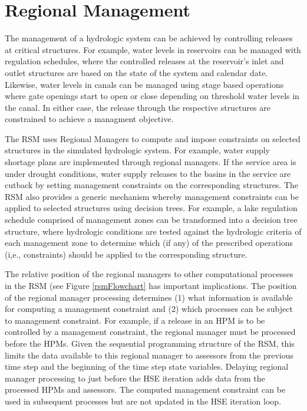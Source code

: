 \chapter{Regional Management}\label{chapter:RegionalManager}

The management of a hydrologic system can be achieved by controlling
releases at critical structures. For example, water levels in
reservoirs can be managed with regulation schedules, where the
controlled releases at the reservoir's inlet and outlet structures are
based on the state of the system and calendar date. Likewise, water
levels in canals can be managed using stage based operations where
gate openings start to open or close depending on threshold water
levels in the canal. In either case, the release through the
respective structures are constrained to achieve a managment
objective.

The RSM uses Regional Managers to compute and impose constraints on
selected structures in the simulated hydrologic system. For example,
water supply shortage plans are implemented through regional
managers. If the service area is under drought conditions, water
supply releases to the basins in the service are cutback by setting
management constraints on the corresponding structures. The RSM also
provides a generic mechanism whereby management constraints can be
applied to selected structures using decision trees. For example, a
lake regulation schedule comprised of management zones can be
transformed into a decision tree structure, where hydrologic
conditions are tested against the hydrologic criteria of each
management zone to determine which (if any) of the prescribed
operations (i,e., constraints) should be applied to the corresponding
structure.

The relative position of the regional managers to other computational
processes in the RSM (see Figure \ref{rsmFlowchart} has important
implications. The position of the regional manager processing
determines (1) what information is available for computing a
management constraint and (2) which processes can be subject to
management constraint. For example, if a release in an HPM is to be
controlled by a management constraint, the regional manager must be
processed before the HPMs. Given the sequential programming structure
of the RSM, this limits the data available to this regional manager to
assessors from the previous time step and the beginning of the time
step state variables. Delaying regional manager processing to just
before the HSE iteration adds data from the processed HPMs and
assessors. The computed management constraint can be used in
subsequent processes but are not updated in the HSE iteration loop.


